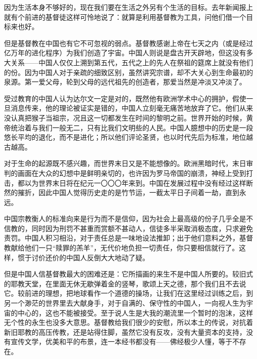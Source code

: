 \par 因为生活本身不够好的，现在我们要在生活之外另有个生活的目标。去年新闻报上就有个前进的基督徒这样可怜地说了：就算是利用基督教为工具，问他们借一个目标来也好。
\par 但是基督教在中国也有它不可忽视的弱点。基督教感谢上帝在七天之内（或是经过亿万年的进化程序）为我们创造了宇宙。中国人则说是盘古开天辟地，但这没有多大关系——中国人仅仅上溯到第五代，五代之上的先人在祭祖的筵席上就没有他们的份。因为中国人对于亲疏的细致区别，虽然讲究宗谱，却不大关心到生命最初的泉源。第一爱父母，轮到父母的远代祖先的创造者，那爱当然是冲淡又冲淡了。
\par 受过教育的中国人认为达尔文一定是对的，既然他有欧洲学术中心的拥护，假使一旦消息传来，他的理论被证实是错的，中国人立刻毫无痛苦地放弃了它。他们从来没认真把猴子当祖宗，况且这一切都发生在时间的黎明之前。世界开始的时候，黄帝统治着与我们一般无二，只有比我们文明些的人民。中国人臆想中的历史是一段悠长平均的退化，而不是进化；所以他们评论圣贤，也以时代先后为标准，地位越古越高。
\par 对于生命的起源既不感兴趣，而世界末日又是不能想像的。欧洲黑暗时代，末日审判的画面在大众的幻想中是鲜明亲切的，也许因为罗马帝国的崩溃，神经上受到打击，都以为世界末日将在纪元一〇〇〇年来到。中国在发展过程中没有经过这样断然的摧折，因此中国人觉得历史走的是竹节运，一截太平日子间着一劫，直到永远。
\par 中国宗教衡人的标准向来是行为而不是信仰，因为社会上最高级的份子几乎全是不信教的，同时因为刑罚不甚重而赏额不甚动人，信徒多半采取消极态度，只求避免责罚。中国人积习相沿，对于责任总是一味地设法推卸；出于他们意料之外，基督教献给他们一只“赎罪的羔羊”，无代价地负担一切责任，你只要相信就行了。这样，惯于讨价还价的中国人反倒大大地动了疑。
\par 但是中国人信基督教最大的困难还是：它所描画的来生不是中国人所要的。较旧式的耶教天堂，在里面无休无歇弹着金的竖琴，歌颂上天之德，那个我们且不去说它。较前进的理想，把地球看作一个道德的操场，让我们在这里经过训练之后，到另一个渺茫的世界里去大献身手，对于自满的、保守性的中国人，一向视人生为宇宙的中心的，这也不能被接受。至于说人生是大我的潮流里一个暂时的泡沫，这样无个性的永生也没多大意思。基督教给我们很少的安慰，所以本土的传说，对抗着新旧耶教的高压传教，还是站得住脚，虽然它没有反攻，没有大量资本的支持，没有宣传文学，优美和平的布景，连一本经书都没有——佛经极少人懂，等于不存在。
